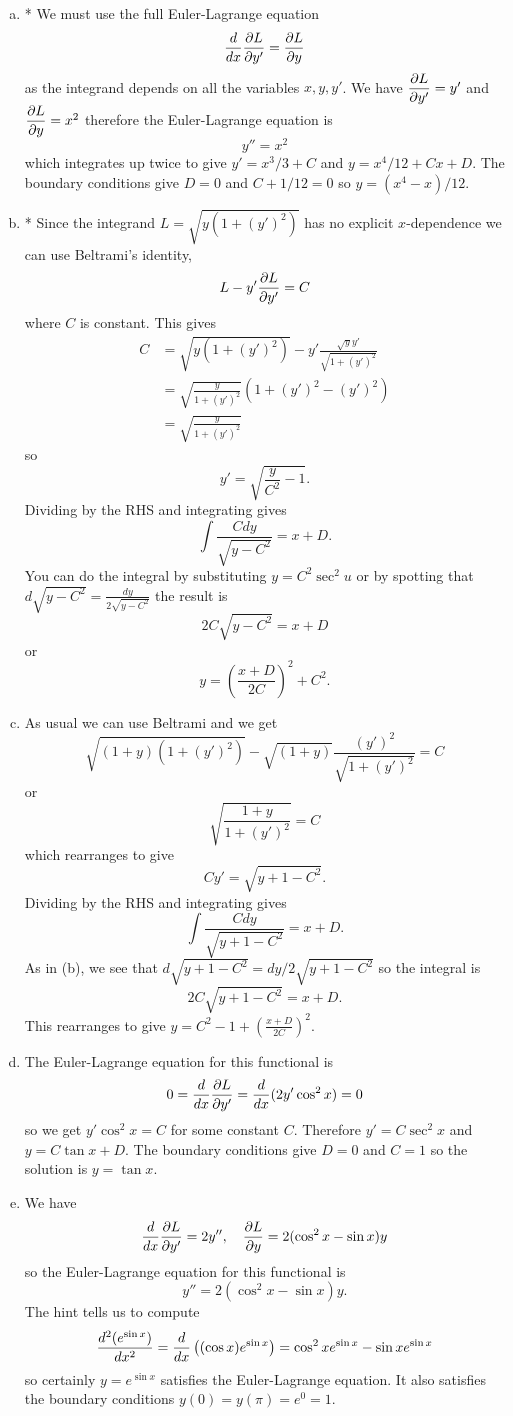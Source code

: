 \documentclass[12pt]{article}
\begin{document}
\iffalse
\begin{answer}
\begin{enumerate}[(a)]
\item * We must use the full Euler-Lagrange equation
\[\dfrac{d }{d x}\dfrac{\partial L}{\partial y'}=\dfrac{\partial L}{\partial y}\]
as the integrand depends on all the variables $x,y,y'$. We have $\dfrac{\partial L}{\partial y'}=y'$ and $\dfrac{\partial L}{\partial y}=x^2$ therefore the Euler-Lagrange equation is
\[y''=x^2\]
which integrates up twice to give $y'=x^3/3+C$ and $y=x^4/12+Cx+D$.
The boundary conditions give $D=0$ and $C+1/12=0$ so $y=(x^4-x)/12$.
\item * Since the integrand $L=\sqrt{y(1+(y')^2)}$ has no explicit $x$-dependence we can use Beltrami's identity,
\[L-y'\dfrac{\partial L}{\partial y'}=C\]
where $C$ is constant. This gives
\begin{align*}
C&=\sqrt{y(1+(y')^2)}-y'\frac{\sqrt{y}y'}{\sqrt{1+(y')^2}}\\
 &=\sqrt{\frac{y}{1+(y')^2}}\left(1+(y')^2-(y')^2\right)\\
 &=\sqrt{\frac{y}{1+(y')^2}}
\end{align*}
so
\[y'=\sqrt{\frac{y}{C^2}-1}.\]
Dividing by the RHS and integrating gives
\[\int\frac{Cdy}{\sqrt{y-C^2}}=x+D.\]
You can do the integral by substituting $y=C^2\sec^2u$ or by spotting that $d\sqrt{y-C^2}=\frac{dy}{2\sqrt{y-C^2}}$ the result is
\[2C\sqrt{y-C^2}=x+D\]
or
\[y=\left(\frac{x+D}{2C}\right)^2+C^2.\]
\item As usual we can use Beltrami and we get
\[\sqrt{(1+y)(1+(y')^2)}-\sqrt{(1+y)}\frac{(y')^2}{\sqrt{1+(y')^2}}=C\]
or
\[\sqrt{\frac{1+y}{1+(y')^2}}=C\]
which rearranges to give
\[Cy'=\sqrt{y+1-C^2}.\]
Dividing by the RHS and integrating gives
\[\int\frac{Cdy}{\sqrt{y+1-C^2}}=x+D.\]
As in (b), we see that $d\sqrt{y+1-C^2}=dy/2\sqrt{y+1-C^2}$ so the integral is
\[2C\sqrt{y+1-C^2}=x+D.\]
This rearranges to give $y=C^2-1+\left(\frac{x+D}{2C}\right)^2$.
\item The Euler-Lagrange equation for this functional is
\[0=\dfrac{d }{d x}\dfrac{\partial L}{\partial y'}=\dfrac{d }{d x}(2y'\cos^2x)=0\]
so we get $y'\cos^2 x=C$ for some constant $C$. Therefore $y'=C\sec^2x$ and $y=C\tan x+D$. The boundary conditions give $D=0$ and $C=1$ so the solution is $y=\tan x$.
\item We have
\[\dfrac{d }{d x}\dfrac{\partial L}{\partial y'}=2y'',\quad\dfrac{\partial L}{\partial y}=2(\cos^2x-\sin x)y\]
so the Euler-Lagrange equation for this functional is
\[y''=2(\cos^2x-\sin x)y.\]
The hint tells us to compute
\[\dfrac{d^2 (e^{\sin x})}{d x^2}=\dfrac{d }{d x}\left((\cos x)e^{\sin x}\right)=\cos^2xe^{\sin x}-\sin xe^{\sin x}\]
so certainly $y=e^{\sin x}$ satisfies the Euler-Lagrange equation. It also satisfies the boundary conditions $y(0)=y(\pi)=e^0=1$.
\end{enumerate}
\end{answer}
\end{document}
